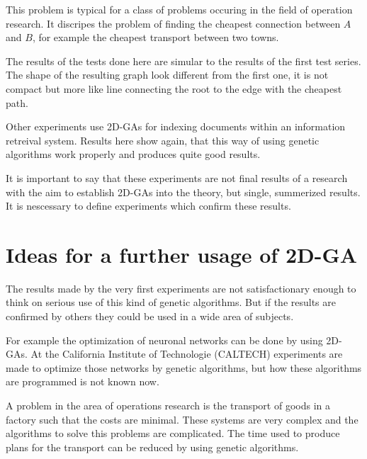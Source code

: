 This problem is typical for a class of problems occuring in the field of operation
research. It discripes the problem of finding the cheapest connection between
$A$ and $B$, for example the cheapest transport between two towns.

The results of the tests done here are simular to the results of the first
test series. The shape of the resulting graph look different from the first
one, it is not compact but more like line connecting the root to the edge with
the cheapest path.

Other experiments use 2D-GAs for indexing documents within an information retreival
system\cite{Loe92}. Results here show again, that this way of using genetic algorithms
work properly and produces quite good results.

It is important to say that these experiments are not final results of a research
with the aim to establish 2D-GAs into the theory, but single, summerized results.
It is nescessary to define experiments which confirm these results.
\section{Ideas for a further usage of 2D-GA}
The results made by the very first experiments are not satisfactionary enough
to think on serious use of this kind of genetic algorithms. But if the results
are confirmed by others they could be used in a wide area of subjects.

For example the optimization of neuronal networks can be done by using 2D-GAs.
At the California Institute of Technologie (CALTECH) experiments are made to
optimize those networks by genetic algorithms, but how these algorithms are
programmed is not known now.

A problem in the area of operations research is the transport of goods in a
factory such that the costs are minimal. These systems are very complex and
the algorithms to solve this problems are complicated. The time used to produce
plans for the transport can be reduced by using genetic algorithms.